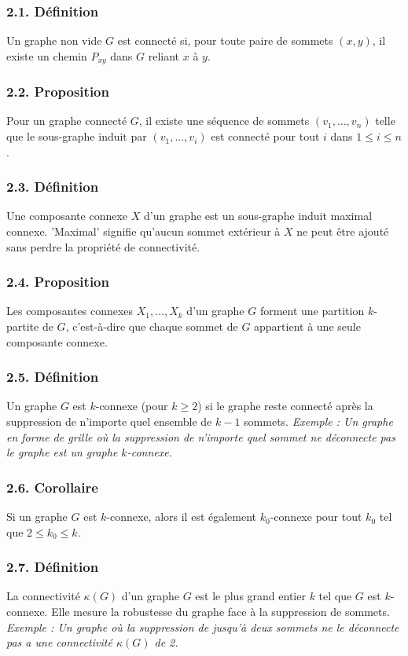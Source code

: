 \subsubsection{2.1. Définition}
Un graphe non vide \( G \) est connecté si, pour toute paire de sommets \( (x, y) \), il existe un chemin \( P_{xy} \) dans \( G \) reliant \( x \) à \( y \).

\subsubsection{2.2. Proposition}
Pour un graphe connecté \( G \), il existe une séquence de sommets \( (v_1, \ldots, v_n) \) telle que le sous-graphe induit par \( (v_1, \ldots, v_i) \) est connecté pour tout \( i \) dans \( 1 \leq i \leq n \).

\subsubsection{2.3. Définition}
Une composante connexe \( X \) d'un graphe est un sous-graphe induit maximal connexe. 'Maximal' signifie qu'aucun sommet extérieur à \( X \) ne peut être ajouté sans perdre la propriété de connectivité.

\subsubsection{2.4. Proposition}
Les composantes connexes \( X_1, \ldots, X_k \) d'un graphe \( G \) forment une partition \( k \)-partite de \( G \), c'est-à-dire que chaque sommet de \( G \) appartient à une seule composante connexe.

\subsubsection{2.5. Définition}
Un graphe \( G \) est \( k \)-connexe (pour \( k \geq 2 \)) si le graphe reste connecté après la suppression de n'importe quel ensemble de \( k - 1 \) sommets.
\textit{Exemple : Un graphe en forme de grille où la suppression de n'importe quel sommet ne déconnecte pas le graphe est un graphe \( k \)-connexe.}

\subsubsection{2.6. Corollaire}
Si un graphe \( G \) est \( k \)-connexe, alors il est également \( k_0 \)-connexe pour tout \( k_0 \) tel que \( 2 \leq k_0 \leq k \).

\subsubsection{2.7. Définition}
La connectivité \( \kappa(G) \) d'un graphe \( G \) est le plus grand entier \( k \) tel que \( G \) est \( k \)-connexe. Elle mesure la robustesse du graphe face à la suppression de sommets.
\textit{Exemple : Un graphe où la suppression de jusqu'à deux sommets ne le déconnecte pas a une connectivité \( \kappa(G) \) de 2.}
